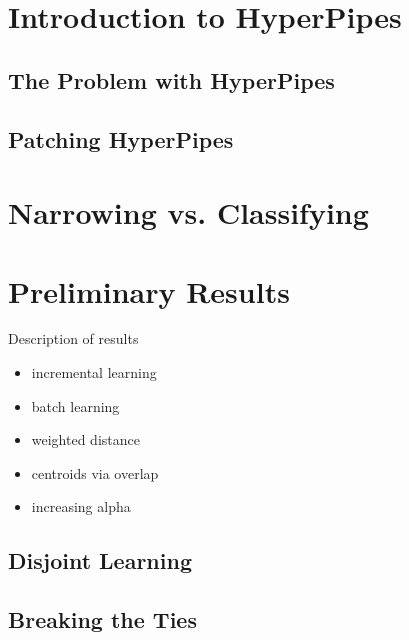 \documentclass{acm_proc_article-sp}
\begin{document}


\section{Introduction to HyperPipes}





\subsection{The Problem with HyperPipes}



\subsection{Patching HyperPipes}



\section{Narrowing vs. Classifying}



\section{Preliminary Results}

Description of results
\begin{itemize}
	\item{incremental learning}
	\item{batch learning}
	\item{weighted distance}
	\item{centroids via overlap}
	\item{increasing alpha}
\end{itemize}

\subsection{Disjoint Learning}



\subsection{Breaking the Ties}
\end{document}
